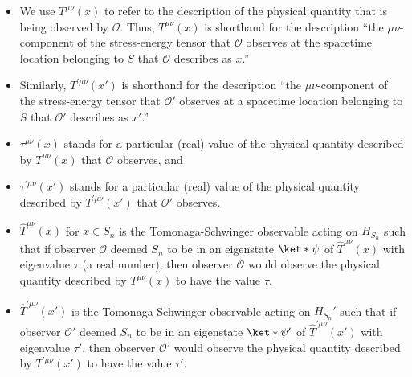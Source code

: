 \documentclass[12pt]{report}
\begin{document}
\begin{itemize}
\item We use $T^{\mu\nu}(x)$ to refer to the description of the physical quantity that is being observed by $\mathcal{O}$. Thus, $T^{\mu\nu}(x)$ is shorthand for the description ``the $\mu\nu$-component of the stress-energy tensor that $\mathcal{O}$ observes at the spacetime location belonging to $S$ that $\mathcal{O}$ describes as  $x$.'' 
\item Similarly,  $T^{\prime\mu\nu}(x')$ is shorthand for the description ``the $\mu\nu$-component of the stress-energy tensor that $\mathcal{O}'$ observes at a spacetime location  belonging to $S$ that $\mathcal{O}'$ describes as $x'$.'' %
% 
\item $\tau^{\mu\nu}(x)$ stands for a particular (real) value of the physical quantity described by $T^{\mu\nu}(x)$ that $\mathcal{O}$ observes, and 
\item $\tau^{\prime\mu\nu}(x')$ stands for a particular (real) value of the physical quantity described by $T^{\prime\mu\nu}(x')$ that $\mathcal{O}'$ observes.%
%
\item $\hat{T}^{\mu\nu}(x)$ for $x\in S_n$ is the Tomonaga-Schwinger observable acting on $H_{S_n}$ such that if observer $\mathcal{O}$ deemed $S_n$ to be in an eigenstate $\ket*{\psi}$ of $\hat{T}^{\mu\nu}(x)$ with eigenvalue $\tau$ (a real number), then observer $\mathcal{O}$ would observe the physical quantity described by  $T^{\mu\nu}(x)$ to have the value $\tau$.
\item $\hat{T}^{\prime\mu\nu}(x')$ is the Tomonaga-Schwinger observable acting on $H_{S_n}'$ such that if observer $\mathcal{O}'$ deemed $S_n$ to be in an eigenstate $\ket*{\psi'}$ of  $\hat{T}^{\prime\mu\nu}(x')$ with eigenvalue $\tau'$, then observer $\mathcal{O}'$ would observe the physical quantity described by  $T^{\prime\mu\nu}(x')$ to have the value $\tau'$.  %
%

\end{itemize}
\end{document}
